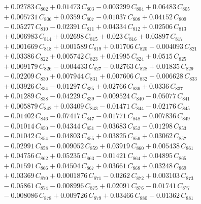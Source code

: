 \documentclass[a4paper,11pt]{article}
\begin{document}
\begin{align}
&\quad + 0.02783\,C_{802} + 0.01473\,C_{803} - 0.003299\,C_{804} + 0.06483\,C_{805} \nonumber\\
&\quad + 0.005731\,C_{806} + 0.0359\,C_{807} - 0.01037\,C_{808} + 0.04152\,C_{809} \nonumber\\
&\quad - 0.05277\,C_{810} - 0.02391\,C_{811} + 0.04334\,C_{812} + 0.02506\,C_{813} \nonumber\\
&\quad + 0.006983\,C_{814} + 0.02698\,C_{815} + 0.023\,C_{816} + 0.03897\,C_{817} \nonumber\\
&\quad + 0.001669\,C_{818} + 0.001589\,C_{819} + 0.01706\,C_{820} - 0.004093\,C_{821} \nonumber\\
&\quad + 0.03386\,C_{822} + 0.005742\,C_{823} + 0.01995\,C_{824} + 0.0515\,C_{825} \nonumber\\
&\quad + 0.009179\,C_{826} - 0.004433\,C_{827} - 0.02763\,C_{828} + 0.01835\,C_{829} \nonumber\\
&\quad - 0.02209\,C_{830} + 0.007944\,C_{831} + 0.007606\,C_{832} - 0.006628\,C_{833} \nonumber\\
&\quad + 0.03926\,C_{834} - 0.01297\,C_{835} + 0.02766\,C_{836} + 0.0336\,C_{837} \nonumber\\
&\quad + 0.01289\,C_{838} - 0.04229\,C_{839} - 0.009524\,C_{840} - 0.05077\,C_{841} \nonumber\\
&\quad + 0.005879\,C_{842} + 0.03409\,C_{843} - 0.01471\,C_{844} - 0.02176\,C_{845} \nonumber\\
&\quad - 0.01402\,C_{846} - 0.07417\,C_{847} - 0.01771\,C_{848} - 0.007836\,C_{849} \nonumber\\
&\quad - 0.01014\,C_{850} - 0.04344\,C_{851} - 0.03683\,C_{852} - 0.01298\,C_{853} \nonumber\\
&\quad - 0.01042\,C_{854} - 0.04803\,C_{855} + 0.03825\,C_{856} + 0.03062\,C_{857} \nonumber\\
&\quad - 0.02991\,C_{858} - 0.009052\,C_{859} + 0.03919\,C_{860} + 0.005438\,C_{861} \nonumber\\
&\quad + 0.04756\,C_{862} + 0.05235\,C_{863} - 0.01421\,C_{864} + 0.04895\,C_{865} \nonumber\\
&\quad + 0.01591\,C_{866} + 0.04504\,C_{867} + 0.03661\,C_{868} + 0.03248\,C_{869} \nonumber\\
&\quad + 0.03369\,C_{870} + 0.0001876\,C_{871} - 0.0262\,C_{872} + 0.003103\,C_{873} \nonumber\\
&\quad - 0.05861\,C_{874} - 0.008996\,C_{875} + 0.02091\,C_{876} - 0.01741\,C_{877} \nonumber\\
&\quad - 0.008086\,C_{878} + 0.009726\,C_{879} + 0.03466\,C_{880} - 0.01362\,C_{881} \nonumber\\

\end{align}
\end{document}
